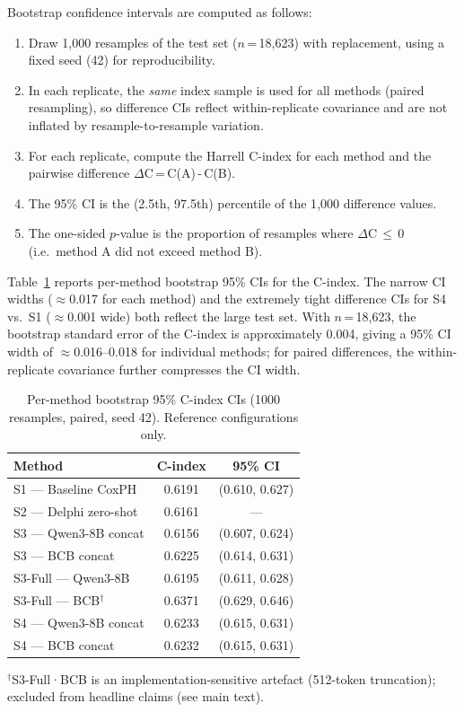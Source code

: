 \documentclass[runningheads]{llncs}
\begin{document}
Bootstrap confidence intervals are computed as follows:
\begin{enumerate}
  \item Draw 1{,}000 resamples of the test set ($n$\,=\,18{,}623) with
        replacement, using a fixed seed (42) for reproducibility.
  \item In each replicate, the \emph{same} index sample is used for all methods
        (paired resampling), so difference CIs reflect within-replicate
        covariance and are not inflated by resample-to-resample variation.
  \item For each replicate, compute the Harrell C-index for each method and
        the pairwise difference $\Delta$C\,=\,C(A)\,-\,C(B).
  \item The 95\% CI is the (2.5th, 97.5th) percentile of the 1{,}000 difference
        values.
  \item The one-sided $p$-value is the proportion of resamples where
        $\Delta$C\,$ \leq\,0$ (i.e.\ method A did not exceed method B).
\end{enumerate}

\noindent Table~\ref{tab:supp_permethod} reports per-method bootstrap 95\% CIs
for the C-index.
The narrow CI widths ($\approx$0.017 for each method) and the extremely tight
difference CIs for S4 vs.\ S1 ($\approx$0.001 wide) both reflect the large
test set.
With $n$\,=\,18{,}623, the bootstrap standard error of the C-index is
approximately 0.004, giving a 95\% CI width of $\approx$0.016--0.018 for
individual methods; for paired differences, the within-replicate covariance
further compresses the CI width.

\begin{table}[H]
\centering
\caption{Per-method bootstrap 95\% C-index CIs (1000 resamples, paired,
         seed 42). Reference configurations only.}
\label{tab:supp_permethod}
\begin{tabular}{lcc}
\toprule
Method & C-index & 95\% CI \\
\midrule
S1 — Baseline CoxPH       & 0.6191 & (0.610, 0.627) \\
S2 — Delphi zero-shot     & 0.6161 & —              \\
S3 — Qwen3-8B concat      & 0.6156 & (0.607, 0.624) \\
S3 — BCB concat           & 0.6225 & (0.614, 0.631) \\
S3-Full — Qwen3-8B        & 0.6195 & (0.611, 0.628) \\
S3-Full — BCB$^\dagger$   & 0.6371 & (0.629, 0.646) \\
S4 — Qwen3-8B concat      & 0.6233 & (0.615, 0.631) \\
S4 — BCB concat           & 0.6232 & (0.615, 0.631) \\
\bottomrule
\end{tabular}
\end{table}
{\small $^\dagger$S3-Full·BCB is an implementation-sensitive artefact
(512-token truncation); excluded from headline claims (see main text).}
\end{document}
